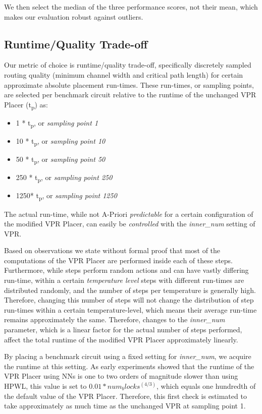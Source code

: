 We then select the median of the three performance scores, not their mean, which makes our evaluation robust against outliers.

\subsection{Runtime/Quality Trade-off}

Our metric of choice is runtime/quality trade-off, specifically discretely sampled routing quality (minimum channel width and critical path length) for certain approximate absolute placement run-times. These run-times, or sampling points, are selected per benchmark circuit relative to the runtime of the unchanged \gls{VPR} Placer (t\textsubscript{p}) as:

\begin{itemize}
	\item 1   * t\textsubscript{p}, or \textit{sampling point 1}
	\item 10  * t\textsubscript{p}, or \textit{sampling point 10}
	\item 50  * t\textsubscript{p}, or \textit{sampling point 50}
	\item 250 * t\textsubscript{p}, or \textit{sampling point 250}
	\item 1250* t\textsubscript{p}, or \textit{sampling point 1250}
\end{itemize}

The actual run-time, while not A-Priori \textit{predictable} for a certain configuration of the modified \gls{VPR} Placer, can easily be \textit{controlled} with the \textit{inner\_num} setting of \gls{VPR}.\cite{vtr8} 

Based on observations we state without formal proof that most of the computations of the \gls{VPR} Placer are performed inside each of these steps. Furthermore, while steps perform random actions and can have vastly differing run-time, within a certain \textit{temperature level} steps with different run-times are distributed randomly, and the number of steps per temperature is generally high. Therefore, changing this number of steps will not change the distribution of step run-times within a certain temperature-level, which means their average run-time remains approximately the same. Therefore, changes to the \textit{inner\_num} parameter, which is a linear factor for the actual number of steps performed, affect the total runtime of the modified \gls{VPR} Placer approximately linearly.

By placing a benchmark circuit using a fixed setting for \textit{inner\_num}, we acquire the runtime at this setting. As early experiments showed that the runtime of the \gls{VPR} Placer using \glspl{NN} is one to two orders of magnitude slower than using \gls{HPWL}, this value is set to $0.01*num_blocks^(4/3)$, which equals one hundredth of the default value of the \gls{VPR} Placer. Therefore, this first check is estimated to take approximately as much time as the unchanged \gls{VPR} at sampling point 1.

